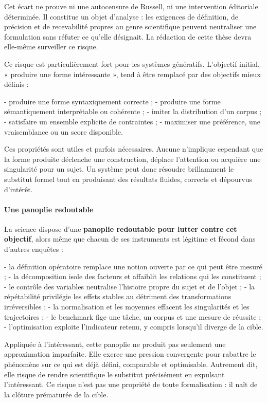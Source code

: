 \documentclass[10pt,a4paper]{article}
\begin{document}
Cet écart ne prouve ni une autocensure de Russell, ni une intervention éditoriale déterminée. Il constitue un objet d'analyse : les exigences de définition, de précision et de recevabilité propres au genre scientifique peuvent neutraliser une formulation sans réfuter ce qu'elle désignait. La rédaction de cette thèse devra elle-même surveiller ce risque.

Ce risque est particulièrement fort pour les systèmes génératifs. L'objectif initial, « produire une forme intéressante », tend à être remplacé par des objectifs mieux définis :

- produire une forme syntaxiquement correcte ; - produire une forme sémantiquement interprétable ou cohérente ; - imiter la distribution d'un corpus ; - satisfaire un ensemble explicite de contraintes ; - maximiser une préférence, une vraisemblance ou un score disponible.

Ces propriétés sont utiles et parfois nécessaires. Aucune n'implique cependant que la forme produite déclenche une construction, déplace l'attention ou acquière une singularité pour un sujet. Un système peut donc résoudre brillamment le substitut formel tout en produisant des résultats fluides, corrects et dépourvus d'intérêt.

\paragraph{Une panoplie redoutable}
La science dispose d'une \textbf{panoplie redoutable pour lutter contre cet objectif}, alors même que chacun de ses instruments est légitime et fécond dans d'autres enquêtes :

- la définition opératoire remplace une notion ouverte par ce qui peut être mesuré ; - la décomposition isole des facteurs et affaiblit les relations qui les constituent ; - le contrôle des variables neutralise l'histoire propre du sujet et de l'objet ; - la répétabilité privilégie les effets stables au détriment des transformations   irréversibles ; - la normalisation et les moyennes effacent les singularités et les trajectoires ; - le benchmark fige une tâche, un corpus et une mesure de réussite ; - l'optimisation exploite l'indicateur retenu, y compris lorsqu'il diverge de la cible.

Appliquée à l'intéressant, cette panoplie ne produit pas seulement une approximation imparfaite. Elle exerce une pression convergente pour rabattre le phénomène sur ce qui est déjà défini, comparable et optimisable. Autrement dit, elle risque de rendre scientifique le substitut précisément en expulsant l'intéressant. Ce risque n'est pas une propriété de toute formalisation : il naît de la clôture prématurée de la cible.
\end{document}
